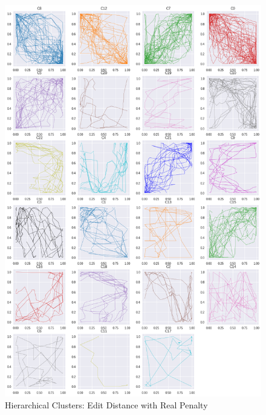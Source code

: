 \begin{figure}[h]
  \centering
  \includegraphics[width=\linewidth,height=\textheight,keepaspectratio]{figs/clusters/CLU_H_ALL[ERP;g=0,0].png}
  \caption{ Hierarchical Clusters: Edit Distance with Real Penalty}
\end{figure}

